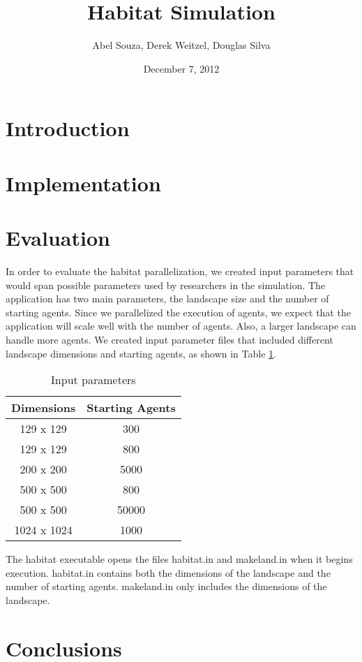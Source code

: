 \documentclass[12pt, notitlepage]{article}
\begin{document}
\title{Habitat Simulation}
\author{Abel Souza, Derek Weitzel, Douglas Silva}
\date{December 7, 2012}

\maketitle

\section{Introduction}

\section{Implementation}

\section{Evaluation}

In order to evaluate the habitat parallelization, we created input parameters that would span possible parameters used by researchers in the simulation.  The application has two main parameters, the landscape size and the number of starting agents.  Since we parallelized the execution of agents, we expect that the application will scale well with the number of agents.  Also, a larger landscape can handle more agents.  We created input parameter files that included different landscape dimensions and starting agents, as shown in Table \ref{tab:parameters}.

\begin{table}[ht]
\centering
\begin{tabular}{ c | c }
\textbf{Dimensions} & \textbf{Starting Agents} \\ 
\hline \hline
129 x 129 & 300 \\
129 x 129 & 800 \\
200 x 200 & 5000 \\
500 x 500 & 800 \\
500 x 500 & 50000 \\
1024 x 1024 & 1000
\end{tabular}
\caption{Input parameters} \label{tab:parameters}
\end{table}


The habitat executable opens the files habitat.in and makeland.in when it begins execution.  habitat.in contains both the dimensions of the landscape and the number of starting agents.  makeland.in only includes the dimensions of the landscape.  



\section{Conclusions}
\end{document}
